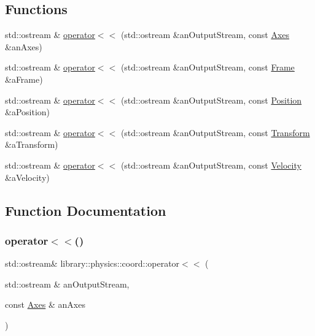 \subsection*{Functions}
\begin{DoxyCompactItemize}
\item 
std\+::ostream \& \hyperlink{namespacelibrary_1_1physics_1_1coord_a0fb058763c93734fffc9ea94fa4f7622}{operator$<$$<$} (std\+::ostream \&an\+Output\+Stream, const \hyperlink{classlibrary_1_1physics_1_1coord_1_1_axes}{Axes} \&an\+Axes)
\item 
std\+::ostream \& \hyperlink{namespacelibrary_1_1physics_1_1coord_a87db7cb3ac6183728948d8d018791bb7}{operator$<$$<$} (std\+::ostream \&an\+Output\+Stream, const \hyperlink{classlibrary_1_1physics_1_1coord_1_1_frame}{Frame} \&a\+Frame)
\item 
std\+::ostream \& \hyperlink{namespacelibrary_1_1physics_1_1coord_afd5bbc777e8bf1c1b56405c89bc5ba66}{operator$<$$<$} (std\+::ostream \&an\+Output\+Stream, const \hyperlink{classlibrary_1_1physics_1_1coord_1_1_position}{Position} \&a\+Position)
\item 
std\+::ostream \& \hyperlink{namespacelibrary_1_1physics_1_1coord_ad6bcffb8bfa72e58047397a14d6785a4}{operator$<$$<$} (std\+::ostream \&an\+Output\+Stream, const \hyperlink{classlibrary_1_1physics_1_1coord_1_1_transform}{Transform} \&a\+Transform)
\item 
std\+::ostream \& \hyperlink{namespacelibrary_1_1physics_1_1coord_a5ed104e38499b8be17b32aecbad31c0c}{operator$<$$<$} (std\+::ostream \&an\+Output\+Stream, const \hyperlink{classlibrary_1_1physics_1_1coord_1_1_velocity}{Velocity} \&a\+Velocity)
\end{DoxyCompactItemize}


\subsection{Function Documentation}
\mbox{\label{namespacelibrary_1_1physics_1_1coord_a0fb058763c93734fffc9ea94fa4f7622}} 
\subsubsection{\texorpdfstring{operator$<$$<$()}{operator<<()}\hspace{0.1cm}{\footnotesize\ttfamily [1/5]}}
{\footnotesize\ttfamily std\+::ostream\& library\+::physics\+::coord\+::operator$<$$<$ (\begin{DoxyParamCaption}\item[{std\+::ostream \&}]{an\+Output\+Stream,  }\item[{const \hyperlink{classlibrary_1_1physics_1_1coord_1_1_axes}{Axes} \&}]{an\+Axes }\end{DoxyParamCaption})}

